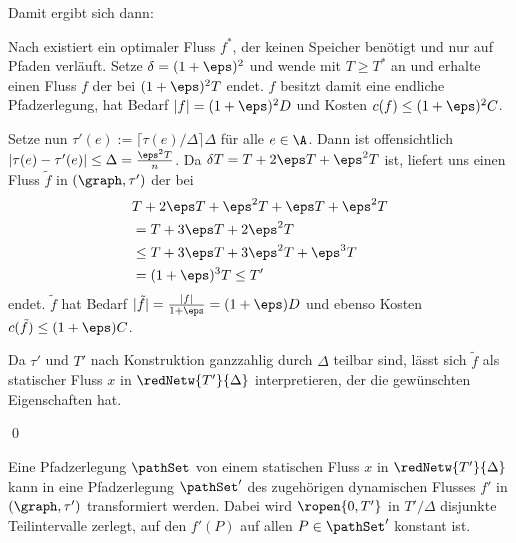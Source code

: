 Damit ergibt sich dann:
\begin{standaloneProof}
    Nach  existiert ein optimaler Fluss $f^*$, der
    keinen Speicher benötigt und nur auf Pfaden verläuft.
    Setze $\delta = (1 + \eps)^2$ und wende  mit
    $T \geq T^*$ an und erhalte einen Fluss $f$ der bei $(1 + \eps)^2 T$ endet.
    $f$ besitzt damit eine endliche Pfadzerlegung, hat Bedarf
    $|f| = (1 + \eps)^2 D$ und Kosten $c(f) \leq (1 + \eps)^2 C$.
    
    Setze nun $\tau'(e) := \lceil \tau(e) / \Delta \rceil \Delta$ für
    alle $e \in \A$. Dann ist offensichtlich
    $|\tau(e) - \tau'(e)| \leq \Delta = \frac{\eps^2 T}{n}$.
    Da $\delta T = T + 2 \eps T + \eps^2 T$ ist, liefert
     uns einen Fluss $\tilde{f}$ in $(\graph, \tau')$
    der bei
    \begin{align*}
        & T + 2 \eps T + \eps^2 T + \eps T + \eps^2 T \\
        & = T + 3 \eps T + 2 \eps^2 T \\
        & \leq T + 3 \eps T + 3 \eps^2 T + \eps^3 T \\
        & = (1 + \eps)^3 T \leq T'
    \end{align*}
    endet. $\tilde{f}$ hat Bedarf
    $|\tilde{f}| = \frac{|f|}{1+\eps} = (1 + \eps) D$ und ebenso
    Kosten $c(\tilde{f}) \leq (1 + \eps) C$.
    
    Da $\tau'$ und $T'$ nach Konstruktion ganzzahlig durch
    $\Delta$ teilbar sind, lässt sich $\tilde{f}$ als statischer Fluss $x$ in
    $\redNetw{T'}{\Delta}$ interpretieren, der die gewünschten
    Eigenschaften hat.
    
    \begin{flushright}\qed \end{flushright}
\end{standaloneProof}

\begin{lemma}\label{lem:path_decomp}
    Eine Pfadzerlegung $\pathSet$ von einem statischen Fluss $x$ in
    $\redNetw{T'}{\Delta}$ kann in eine Pfadzerlegung $\pathSet'$ des
    zugehörigen dynamischen Flusses $f'$ in $(\graph, \tau')$ 
    transformiert werden. Dabei wird $\ropen{0, T'}$ in $T'/\Delta$
    disjunkte Teilintervalle zerlegt, auf den $f'(P)$ auf allen $P \in \pathSet'$
    konstant ist.
\end{lemma}

